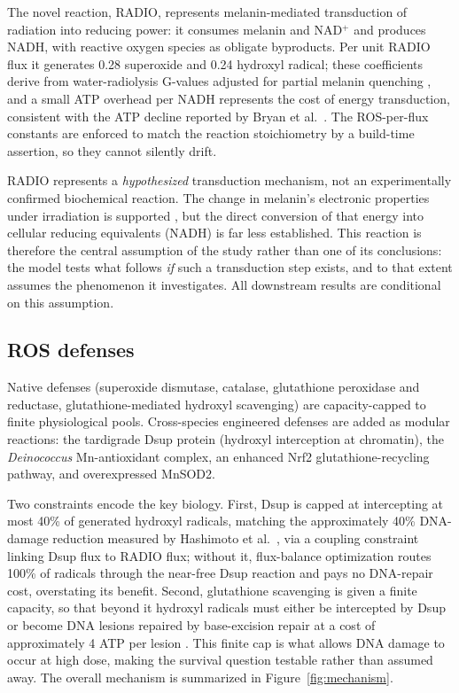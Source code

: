 \documentclass[11pt]{article}
\begin{document}
The novel reaction, RADIO, represents melanin-mediated transduction of radiation
into reducing power: it consumes melanin and NAD$^{+}$ and produces NADH, with
reactive oxygen species as obligate byproducts. Per unit RADIO flux it generates
0.28 superoxide and 0.24 hydroxyl radical; these coefficients derive from
water-radiolysis G-values \cite{buxton1988} adjusted for partial melanin quenching
\cite{schweitzer2009}, and a small ATP overhead per NADH represents the cost of
energy transduction, consistent with the ATP decline reported by Bryan et al.\
\cite{bryan2011}. The ROS-per-flux constants are enforced to match the reaction
stoichiometry by a build-time assertion, so they cannot silently drift.

RADIO represents a \textit{hypothesized} transduction mechanism, not an
experimentally confirmed biochemical reaction. The change in melanin's electronic
properties under irradiation is supported \cite{dadachova2007,turick2011}, but the
direct conversion of that energy into cellular reducing equivalents (NADH) is far
less established. This reaction is therefore the central assumption of the study
rather than one of its conclusions: the model tests what follows \textit{if} such a
transduction step exists, and to that extent assumes the phenomenon it
investigates. All downstream results are conditional on this assumption.

\subsection{ROS defenses}

Native defenses (superoxide dismutase, catalase, glutathione peroxidase and
reductase, glutathione-mediated hydroxyl scavenging) are capacity-capped to finite
physiological pools. Cross-species engineered defenses are added as modular
reactions: the tardigrade Dsup protein (hydroxyl interception at chromatin), the
\textit{Deinococcus} Mn-antioxidant complex, an enhanced Nrf2 glutathione-recycling
pathway, and overexpressed MnSOD2.

Two constraints encode the key biology. First, Dsup is capped at intercepting at
most 40\% of generated hydroxyl radicals, matching the approximately 40\%
DNA-damage reduction measured by Hashimoto et al.\ \cite{hashimoto2016}, via a
coupling constraint linking Dsup flux to RADIO flux; without it, flux-balance
optimization routes 100\% of radicals through the near-free Dsup reaction and pays
no DNA-repair cost, overstating its benefit. Second, glutathione scavenging is
given a finite capacity, so that beyond it hydroxyl radicals must either be
intercepted by Dsup or become DNA lesions repaired by base-excision repair at a
cost of approximately 4 ATP per lesion \cite{lindahl2000}. This finite cap is what
allows DNA damage to occur at high dose, making the survival question testable
rather than assumed away. The overall mechanism is summarized in
Figure~\ref{fig:mechanism}.
\end{document}
